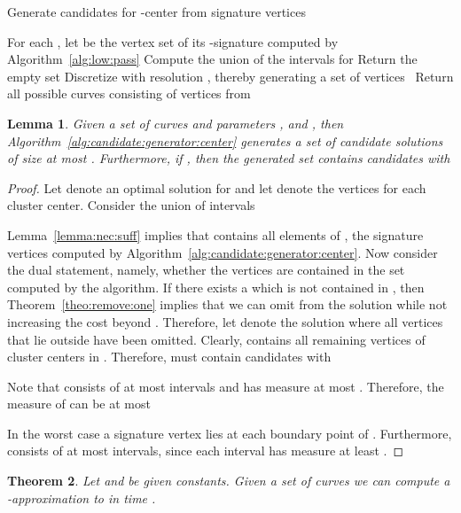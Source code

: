 \documentclass[11pt, letter]{article}
\newtheorem{theorem}{Theorem}[section]
\newtheorem{lemma}[theorem]{Lemma}
\newcommand{\thmlab}[1]{{\label{theo:#1}}}
\newcommand{\thmref}[1]{Theorem~\ref{theo:#1}}
\newcommand{\lemlab}[1]{\label{lemma:#1}}
\newcommand{\lemref}[1]{Lemma~\ref{lemma:#1}}
\newcommand{\alglab}[1]{\label{alg:#1}}
\newcommand{\algref}[1]{Algorithm~\ref{alg:#1}}
\begin{document}
\begin{algorithm}[h]\alglab{candidate:generator:center}
 \caption{Generate candidates for -center from signature vertices}
For each , let  be the vertex set of its -signature computed by \algref{low:pass}\; 
Compute the union  of the intervals  for \; 
\eIf{ }
{Return the empty set\;}
{Discretize  with resolution , thereby generating a set of vertices~\;
Return all possible curves consisting of  vertices from \;}
\end{algorithm}

\begin{lemma}\lemlab{candidate:generator:center}
Given a set of curves  and parameters
, and , then \algref{candidate:generator:center}
generates a set of candidate solutions 
of size at most .
Furthermore, if , then the generated set contains 
 candidates  with 

\end{lemma}

\begin{proof} 
Let   denote an optimal solution for  and  
let  denote the vertices for each cluster
center. 
Consider the union of intervals

\lemref{nec:suff} implies that  contains all elements of , the
signature vertices computed by \algref{candidate:generator:center}.
Now consider the dual statement, namely, whether the vertices  are contained in the set  computed by the algorithm.
If there exists a  which is not contained in , then
\thmref{remove:one} implies that we can omit  from the solution 
while not increasing the cost beyond .
Therefore, let  denote the solution 
where all vertices that lie outside  have been omitted.
Clearly,  contains all remaining vertices of cluster centers in . 
Therefore,  must contain 
candidates  with 

Note that  consists of at most  intervals and has measure at most
.
Therefore, the measure of  can be at most 

In the worst case a signature vertex lies at each boundary point of .
Furthermore,  consists of at most  
intervals, since each interval has measure at least .
\end{proof}



\begin{theorem}\thmlab{k:l:center:main}
Let  and  be given constants. 
Given a set of curves 
we can compute a -approximation to 
in time . 
\end{theorem}
\end{document}

